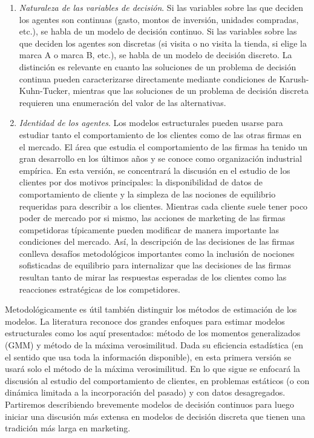 \documentclass[
]{book}
\begin{document}
\begin{enumerate}
\item
  \emph{Naturaleza de las variables de decisión}. Si las variables sobre las que deciden los agentes son continuas (gasto, montos de inversión, unidades compradas, etc.), se habla de un modelo de decisión continuo. Si las variables sobre las que deciden los agentes son discretas (si visita o no visita la tienda, si elige la marca A o marca B, etc.), se habla de un modelo de decisión discreto. La distinción es relevante en cuanto las soluciones de un problema de decisión continua pueden caracterizarse directamente mediante condiciones de Karush-Kuhn-Tucker, mientras que las soluciones de un problema de decisión discreta requieren una enumeración del valor de las alternativas.
\item
  \emph{Identidad de los agentes}. Los modelos estructurales pueden usarse para estudiar tanto el comportamiento de los clientes como de las otras firmas en el mercado. El área que estudia el comportamiento de las firmas ha tenido un gran desarrollo en los últimos años y se conoce como organización industrial empírica. En esta versión, se concentrará la discusión en el estudio de los clientes por dos motivos principales: la disponibilidad de datos de comportamiento de cliente y la simpleza de las nociones de equilibrio requeridas para describir a los clientes. Mientras cada cliente suele tener poco poder de mercado por si mismo, las acciones de marketing de las firmas competidoras típicamente pueden modificar de manera importante las condiciones del mercado. Así, la descripción de las decisiones de las firmas conlleva desafíos metodológicos importantes como la inclusión de nociones sofisticadas de equilibrio para internalizar que las decisiones de las firmas resultan tanto de mirar las respuestas esperadas de los clientes como las reacciones estratégicas de los competidores.
\end{enumerate}

Metodológicamente es útil también distinguir los métodos de estimación de los modelos. La literatura reconoce dos grandes enfoques para estimar modelos estructurales como los aquí presentados: método de los momentos generalizados (GMM) y método de la máxima verosimilitud. Dada su eficiencia estadística (en el sentido que usa toda la información disponible), en esta primera versión se usará solo el método de la máxima verosimilitud. En lo que sigue se enfocará la discusión al estudio del comportamiento de clientes, en problemas estáticos (o con dinámica limitada a la incorporación del pasado) y con datos desagregados. Partiremos describiendo brevemente modelos de decisión continuos para luego iniciar una discusión más extensa en modelos de decisión discreta que tienen una tradición más larga en marketing.
\end{document}
